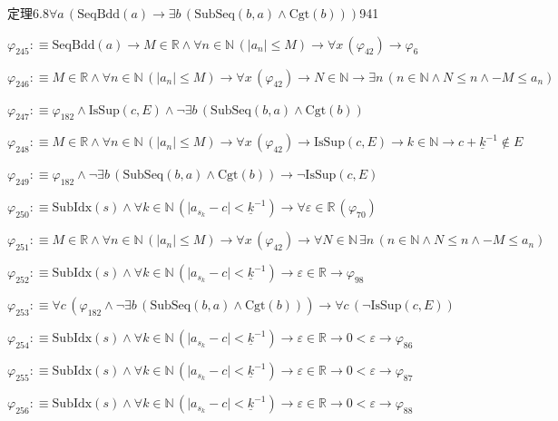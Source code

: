 \begin{fullproof}{定理6.8}{$\forall a\,(\mathrm{SeqBdd}(a) \to \exists b\,(\mathrm{SubSeq}(b,a) \land \mathrm{Cgt}(b)))$}{941}
\begin{abbrevlist}
\item $\varphi_{245} :\equiv \mathrm{SeqBdd}(a) \to M \in \mathbb{R} \land \forall n \in \mathbb{N}\,(\lvert a_{n} \rvert \leq M) \to \forall x\,(\varphi_{42}) \to \varphi_{6}$
\item $\varphi_{246} :\equiv M \in \mathbb{R} \land \forall n \in \mathbb{N}\,(\lvert a_{n} \rvert \leq M) \to \forall x\,(\varphi_{42}) \to N \in \mathbb{N} \to \exists n\,(n \in \mathbb{N} \land N \leq n \land -M \leq a_{n})$
\item $\varphi_{247} :\equiv \varphi_{182} \land \mathrm{IsSup}(c,E) \land \neg \exists b\,(\mathrm{SubSeq}(b,a) \land \mathrm{Cgt}(b))$
\item $\varphi_{248} :\equiv M \in \mathbb{R} \land \forall n \in \mathbb{N}\,(\lvert a_{n} \rvert \leq M) \to \forall x\,(\varphi_{42}) \to \mathrm{IsSup}(c,E) \to k \in \mathbb{N} \to c + \underline{k}^{-1} \notin E$
\item $\varphi_{249} :\equiv \varphi_{182} \land \neg \exists b\,(\mathrm{SubSeq}(b,a) \land \mathrm{Cgt}(b)) \to \neg \mathrm{IsSup}(c,E)$
\item $\varphi_{250} :\equiv \mathrm{SubIdx}(s) \land \forall k \in \mathbb{N}\,(\lvert a_{s_{k}} - c \rvert < \underline{k}^{-1}) \to \forall \varepsilon \in \mathbb{R}\,(\varphi_{70})$
\item $\varphi_{251} :\equiv M \in \mathbb{R} \land \forall n \in \mathbb{N}\,(\lvert a_{n} \rvert \leq M) \to \forall x\,(\varphi_{42}) \to \forall N \in \mathbb{N}\,\exists n\,(n \in \mathbb{N} \land N \leq n \land -M \leq a_{n})$
\item $\varphi_{252} :\equiv \mathrm{SubIdx}(s) \land \forall k \in \mathbb{N}\,(\lvert a_{s_{k}} - c \rvert < \underline{k}^{-1}) \to \varepsilon \in \mathbb{R} \to \varphi_{98}$
\item $\varphi_{253} :\equiv \forall c\,(\varphi_{182} \land \neg \exists b\,(\mathrm{SubSeq}(b,a) \land \mathrm{Cgt}(b))) \to \forall c\,(\neg \mathrm{IsSup}(c,E))$
\item $\varphi_{254} :\equiv \mathrm{SubIdx}(s) \land \forall k \in \mathbb{N}\,(\lvert a_{s_{k}} - c \rvert < \underline{k}^{-1}) \to \varepsilon \in \mathbb{R} \to 0 < \varepsilon \to \varphi_{86}$
\item $\varphi_{255} :\equiv \mathrm{SubIdx}(s) \land \forall k \in \mathbb{N}\,(\lvert a_{s_{k}} - c \rvert < \underline{k}^{-1}) \to \varepsilon \in \mathbb{R} \to 0 < \varepsilon \to \varphi_{87}$
\item $\varphi_{256} :\equiv \mathrm{SubIdx}(s) \land \forall k \in \mathbb{N}\,(\lvert a_{s_{k}} - c \rvert < \underline{k}^{-1}) \to \varepsilon \in \mathbb{R} \to 0 < \varepsilon \to \varphi_{88}$

\end{abbrevlist}
\end{fullproof}
